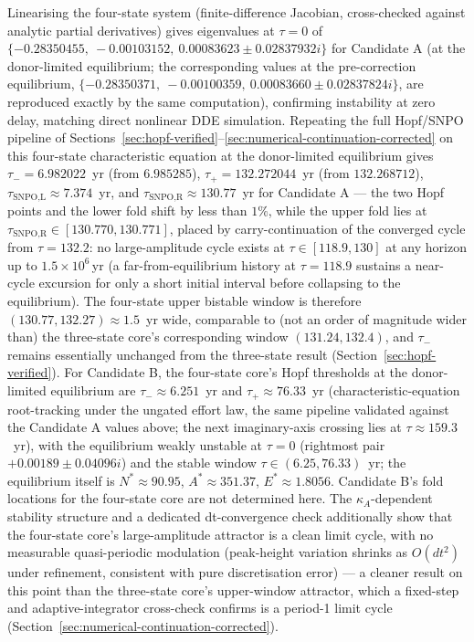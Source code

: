 \documentclass[twocolumn,10pt]{article}
\begin{document}
Linearising the four-state system (finite-difference Jacobian, cross-checked against analytic partial derivatives) gives eigenvalues at $\tau=0$ of $\{-0.28350455,\ -0.00103152,\ 0.00083623\pm0.02837932i\}$ for Candidate A (at the donor-limited equilibrium; the corresponding values at the pre-correction equilibrium, $\{-0.28350371,\ -0.00100359,\ 0.00083660\pm0.02837824i\}$, are reproduced exactly by the same computation), confirming instability at zero delay, matching direct nonlinear DDE simulation. Repeating the full Hopf/SNPO pipeline of Sections~\ref{sec:hopf-verified}--\ref{sec:numerical-continuation-corrected} on this four-state characteristic equation at the donor-limited equilibrium gives $\tau_-=6.982022$~yr (from $6.985285$), $\tau_+=132.272044$~yr (from $132.268712$), $\tau_{\text{SNPO,L}}\approx7.374$~yr, and $\tau_{\text{SNPO,R}}\approx130.77$~yr for Candidate A --- the two Hopf points and the lower fold shift by less than $1\%$, while the upper fold lies at $\tau_{\text{SNPO,R}}\in[130.770,130.771]$, placed by carry-continuation of the converged cycle from $\tau=132.2$: no large-amplitude cycle exists at $\tau\in[118.9,130]$ at any horizon up to $1.5\times10^6$\,yr (a far-from-equilibrium history at $\tau=118.9$ sustains a near-cycle excursion for only a short initial interval before collapsing to the equilibrium). The four-state upper bistable window is therefore $(130.77,132.27)\approx1.5$~yr wide, comparable to (not an order of magnitude wider than) the three-state core's corresponding window $(131.24,132.4)$, and $\tau_-$ remains essentially unchanged from the three-state result (Section~\ref{sec:hopf-verified}). For Candidate B, the four-state core's Hopf thresholds at the donor-limited equilibrium are $\tau_-\approx6.251$~yr and $\tau_+\approx76.33$~yr (characteristic-equation root-tracking under the ungated effort law, the same pipeline validated against the Candidate A values above; the next imaginary-axis crossing lies at $\tau\approx159.3$~yr), with the equilibrium weakly unstable at $\tau=0$ (rightmost pair $+0.00189\pm0.04096i$) and the stable window $\tau\in(6.25,76.33)$~yr; the equilibrium itself is $N^*\approx90.95$, $A^*\approx351.37$, $E^*\approx1.8056$. Candidate B's fold locations for the four-state core are not determined here. The $\kappa_A$-dependent stability structure and a dedicated dt-convergence check additionally show that the four-state core's large-amplitude attractor is a clean limit cycle, with no measurable quasi-periodic modulation (peak-height variation shrinks as $O(dt^2)$ under refinement, consistent with pure discretisation error) --- a cleaner result on this point than the three-state core's upper-window attractor, which a fixed-step and adaptive-integrator cross-check confirms is a period-1 limit cycle (Section~\ref{sec:numerical-continuation-corrected}).
\end{document}
